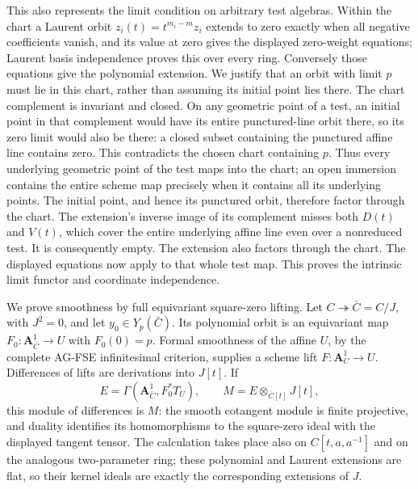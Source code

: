 \documentclass[11pt,a4paper,openany]{report}
\begin{document}
This also represents the limit condition on arbitrary test algebras. Within the chart a Laurent orbit \(z_i(t)=t^{m_i-m}z_i\) extends to zero exactly when all negative coefficients vanish, and its value at zero gives the displayed zero-weight equations; Laurent basis independence proves this over every ring. Conversely those equations give the polynomial extension. We justify that an orbit with limit \(p\) must lie in this chart, rather than assuming its initial point lies there. The chart complement is invariant and closed. On any geometric point of a test, an initial point in that complement would have its entire punctured-line orbit there, so its zero limit would also be there: a closed subset containing the punctured affine line contains zero. This contradicts the chosen chart containing \(p\). Thus every underlying geometric point of the test maps into the chart; an open immersion contains the entire scheme map precisely when it contains all its underlying points. The initial point, and hence its punctured orbit, therefore factor through the chart. The extension's inverse image of its complement misses both \(D(t)\) and \(V(t)\), which cover the entire underlying affine line even over a nonreduced test. It is consequently empty. The extension also factors through the chart. The displayed equations now apply to that whole test map. This proves the intrinsic limit functor and coordinate independence.

We prove smoothness by full equivariant square-zero lifting. Let \(C\twoheadrightarrow\bar C=C/J\), with \(J^2=0\), and let \(y_0\in Y_p(\bar C)\). Its polynomial orbit is an equivariant map \(F_0:\mathbf A^1_{\bar C}\to U\) with \(F_0(0)=p\). Formal smoothness of the affine \(U\), by the complete AG-FSE infinitesimal criterion, supplies a scheme lift \(F:\mathbf A^1_C\to U\). Differences of lifts are derivations into \(J[t]\). If \[
 E=\Gamma(\mathbf A^1_{\bar C},F_0^*T_U),\qquad
 M=E\otimes_{\bar C[t]}J[t],
\] this module of differences is \(M\): the smooth cotangent module is finite projective, and duality identifies its homomorphisms to the square-zero ideal with the displayed tangent tensor. The calculation takes place also on \(C[t,a,a^{-1}]\) and on the analogous two-parameter ring; these polynomial and Laurent extensions are flat, so their kernel ideals are exactly the corresponding extensions of \(J\).
\end{document}

